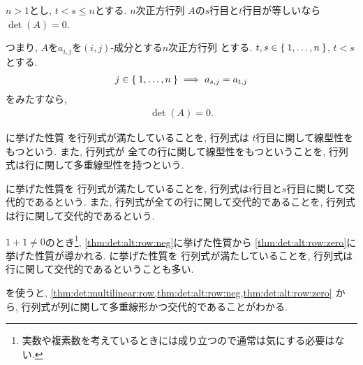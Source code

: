 \begin{theorem}
  \label{thm:det:alt:row:zero}
  $n>1$とし, $t<s\leq n$とする. 
  $n$次正方行列
  $A$の$s$行目と$t$行目が等しいなら$\det(A)=0$.

  つまり, 
  $A$を$a_{i,j}$を$(i,j)$-成分とする$n$次正方行列
  とする.
  $t, s\in\Set{1,\ldots,n}$, $t<s$とする. 
  \begin{align*}
    j\in\Set{1,\ldots,n}\implies a_{s,j}=a_{t,j}
  \end{align*}
  をみたすなら,
  \begin{align*}
    \det(A)=0.
  \end{align*}
\end{theorem}

\begin{remark}
  に挙げた性質
  を行列式が満たしていることを,
  行列式は
  $t$行目に関して線型性をもつという.
  また,
  行列式が
  全ての行に関して線型性をもつということを,
  行列式は行に関して多重線型性を持つという.

  に挙げた性質を
  行列式が満たしていることを,
  行列式は$t$行目と$s$行目に関して交代的であるという.
  また, 行列式が全ての行に関して交代的であることを,
  行列式は行に関して交代的であるという.

  $1+1\neq 0$のとき\footnote{実数や複素数を考えているときには成り立つので通常は気にする必要はない.},
  \cref{thm:det:alt:row:neg}に挙げた性質から
  \cref{thm:det:alt:row:zero}に挙げた性質が導かれる.
  に挙げた性質を
  行列式が満たしていることを,
  行列式は行に関して交代的であるということも多い.
\end{remark}

を使うと,
\cref{thm:det:multilinear:row,thm:det:alt:row:neg,thm:det:alt:row:zero}
から,
行列式が列に関して多重線形かつ交代的であることがわかる.

